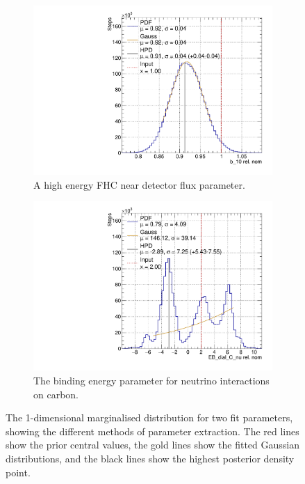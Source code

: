 \begin{figure}
\centering
\begin{subfigure}{.5\textwidth}
  \centering
  \includegraphics[width=0.95\linewidth]{figs/b_10}
  \caption{A high energy FHC near detector flux parameter.}
  \label{fig:b10}
\end{subfigure}%
\begin{subfigure}{.5\textwidth}
  \centering
  \includegraphics[width=0.95\linewidth]{figs/EB_dial_C_nuData}
  \caption{The binding energy parameter for neutrino interactions on carbon.}
  \label{fig:Eb}
\end{subfigure}
\caption{The 1-dimensional marginalised distribution for two fit parameters, showing the different methods of parameter extraction. The red lines show the prior central values, the gold lines show the fitted Gaussian distributions, and the black lines show the highest posterior density point.}
\label{fig:1dposts}
\end{figure}

